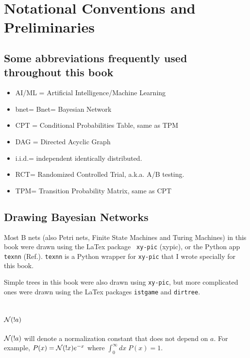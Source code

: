

\chapter{Notational Conventions and Preliminaries}

\label{ch-conventions}
\section{Some abbreviations frequently
used throughout this book}

\begin{itemize}
\item
AI/ML  = Artificial Intelligence/Machine Learning
\item
bnet= Bnet= Bayesian Network
\item
CPT = Conditional Probabilities Table,
 same as TPM
\item
DAG = Directed Acyclic Graph
\item
i.i.d.= independent identically
distributed.
 \item
 RCT= Randomized Controlled Trial,
a.k.a. A/B testing.

\item
TPM= Transition Probability Matrix,
same as CPT

\end{itemize}

\section{Drawing Bayesian Networks}
Most B nets (also Petri nets, Finite State Machines and Turing Machines)
in this book were drawn using the LaTex package {\tt
 xy-pic} (xypic), or the Python app {\tt texnn} (Ref.\cite{texnn}). {\tt texnn} is a Python wrapper for
{\tt xy-pic} that I wrote specially for this book.

Simple trees in this book were also
drawn using {\tt xy-pic}, but more complicated
ones were drawn using the LaTex packages {\tt istgame}
and {\tt dirtree}.


\section{${\cal N}(!a)$}
${\cal N}(!a)$ will denote
a normalization constant that does not depend
on $a$. For example, $P(x)={\cal N}(!x)e^{-x}$
where $\int_0^\infty dx \;P(x)=1$.

